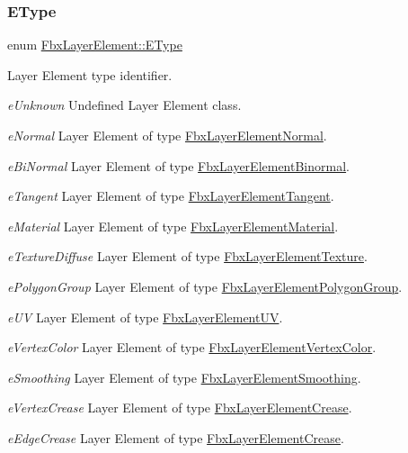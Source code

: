\mbox{\label{class_fbx_layer_element_a8c95c5cd880b56c776acd379bd86f42c}} 
\subsubsection{\texorpdfstring{E\+Type}{EType}}
{\footnotesize\ttfamily enum \hyperlink{class_fbx_layer_element_a8c95c5cd880b56c776acd379bd86f42c}{Fbx\+Layer\+Element\+::\+E\+Type}}

Layer Element type identifier.
\begin{DoxyItemize}
\item {\itshape e\+Unknown} Undefined Layer Element class.
\item {\itshape e\+Normal} Layer Element of type \hyperlink{class_fbx_layer_element_normal}{Fbx\+Layer\+Element\+Normal}.
\item {\itshape e\+Bi\+Normal} Layer Element of type \hyperlink{class_fbx_layer_element_binormal}{Fbx\+Layer\+Element\+Binormal}.
\item {\itshape e\+Tangent} Layer Element of type \hyperlink{class_fbx_layer_element_tangent}{Fbx\+Layer\+Element\+Tangent}.
\item {\itshape e\+Material} Layer Element of type \hyperlink{class_fbx_layer_element_material}{Fbx\+Layer\+Element\+Material}.
\item {\itshape e\+Texture\+Diffuse} Layer Element of type \hyperlink{class_fbx_layer_element_texture}{Fbx\+Layer\+Element\+Texture}.
\item {\itshape e\+Polygon\+Group} Layer Element of type \hyperlink{class_fbx_layer_element_polygon_group}{Fbx\+Layer\+Element\+Polygon\+Group}.
\item {\itshape e\+UV} Layer Element of type \hyperlink{class_fbx_layer_element_u_v}{Fbx\+Layer\+Element\+UV}.
\item {\itshape e\+Vertex\+Color} Layer Element of type \hyperlink{class_fbx_layer_element_vertex_color}{Fbx\+Layer\+Element\+Vertex\+Color}.
\item {\itshape e\+Smoothing} Layer Element of type \hyperlink{class_fbx_layer_element_smoothing}{Fbx\+Layer\+Element\+Smoothing}.
\item {\itshape e\+Vertex\+Crease} Layer Element of type \hyperlink{class_fbx_layer_element_crease}{Fbx\+Layer\+Element\+Crease}.
\item {\itshape e\+Edge\+Crease} Layer Element of type \hyperlink{class_fbx_layer_element_crease}{Fbx\+Layer\+Element\+Crease}.

\end{DoxyItemize}
